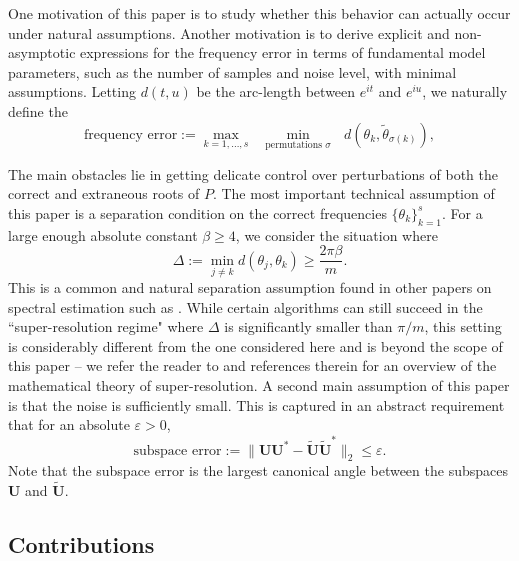 \documentclass[11pt]{article}
\theoremstyle{definition}
\numberwithin{theorem}{section}
\numberwithin{equation}{section}
\renewcommand{\tilde}{\widetilde}
\renewcommand{\epsilon}{\varepsilon}
\newcommand{\bfU}{{\boldsymbol U}}
\numberwithin{equation}{section}
\begin{document}
One motivation of this paper is to study whether this behavior can actually occur under natural assumptions. Another motivation is to derive explicit and non-asymptotic expressions for the frequency error in terms of fundamental model parameters, such as the number of samples and noise level, with minimal assumptions. Letting $d(t,u)$ be the arc-length between $e^{it}$ and $e^{iu}$, we naturally define the 
$$
\text{frequency error}
:=\max_{k=1,\dots,s} \ \ \ \min_{\text{permutations } \sigma} \ \ \ d(\theta_k, \tilde \theta_{\sigma(k)}),
$$

The main obstacles lie in getting delicate control over perturbations of both the correct and extraneous roots of $P$. The most important technical assumption of this paper is a separation condition on the correct frequencies $\{\theta_k\}_{k=1}^s$. For a large enough absolute constant $\beta\geq 4$, we consider the situation where
\begin{equation}
    \label{eq:delta}
    \Delta := \min_{j\not=k} d(\theta_j,\theta_k)
    \geq \frac {2\pi \beta} m.
\end{equation}
This is a common and natural separation assumption found in other papers on spectral estimation such as \cite{candes2013super,duval2015exact,moitra2015matrixpencil,fannjiang2025optimality}. While certain algorithms can still succeed in the ``super-resolution regime" where $\Delta$ is significantly smaller than $\pi/m$, this setting is considerably different from the one considered here and is beyond the scope of this paper -- we refer the reader to \cite{li2021stable,batenkov2021super} and references therein for an overview of the mathematical theory of super-resolution. A second main assumption of this paper is that the noise is sufficiently small. This is captured in an abstract requirement that for an absolute $\epsilon>0$, 
$$
\text{subspace error} := \Big\|\bfU\bfU^*-\tilde \bfU\tilde \bfU^*\Big\|_2 \leq \epsilon.
$$
Note that the subspace error is the largest canonical angle between the subspaces $\bfU$ and $\tilde \bfU$. 

\subsection{Contributions}
\end{document}
